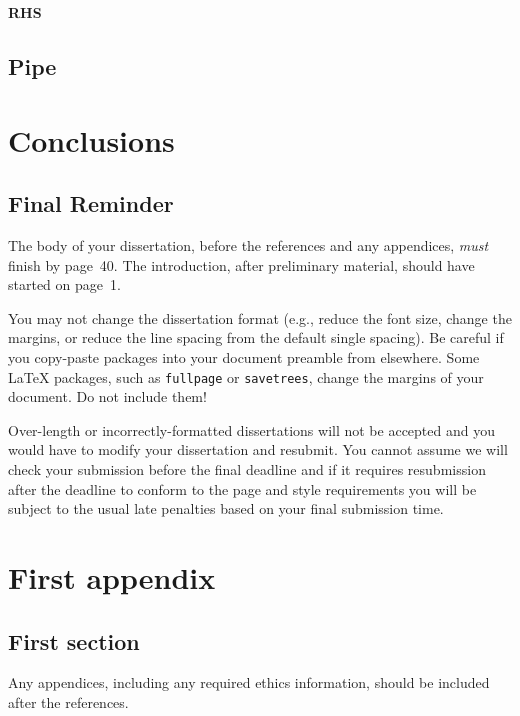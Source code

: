 \documentclass[logo,bsc,singlespacing,parskip]{infthesis}
\begin{document}
\textbf{RHS}

\section{Pipe}

\chapter{Conclusions}

\section{Final Reminder}

The body of your dissertation, before the references and any appendices,
\emph{must} finish by page~40. The introduction, after preliminary material,
should have started on page~1.

You may not change the dissertation format (e.g., reduce the font size, change
the margins, or reduce the line spacing from the default single spacing). Be
careful if you copy-paste packages into your document preamble from elsewhere.
Some \LaTeX{} packages, such as \texttt{fullpage} or \texttt{savetrees}, change
the margins of your document. Do not include them!

Over-length or incorrectly-formatted dissertations will not be accepted and you
would have to modify your dissertation and resubmit. You cannot assume we will
check your submission before the final deadline and if it requires resubmission
after the deadline to conform to the page and style requirements you will be
subject to the usual late penalties based on your final submission time.

% 




\appendix

\chapter{First appendix}

\section{First section}

Any appendices, including any required ethics information, should be included
after the references.
\end{document}
